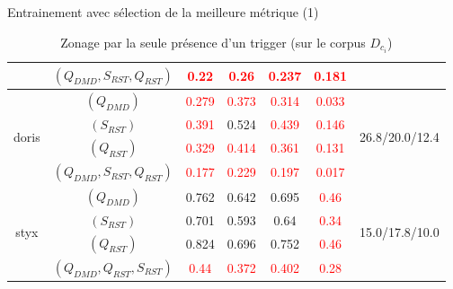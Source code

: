 \documentclass[newPxFont,pagenumber]{beamer}
\begin{document}
\begin{frame}{Entrainement avec sélection de la meilleure métrique (1)}
\begin{table}[!htbp]
\begin{tabular}{|c|c|c|c|c|c|c|}
 & $(Q_{DMD},S_{RST}, Q_{RST})$ & \textcolor{red}{0.22} & \textcolor{red}{0.26} & \textcolor{red}{0.237} & \textcolor{red}{0.181} &  \\  \hline
 \multirow{4}{*}{doris} & $(Q_{DMD})$ & \textcolor{red}{0.279} & \textcolor{red}{0.373} & \textcolor{red}{0.314} & \textcolor{red}{0.033} & \multirow{4}{*}{26.8/20.0/12.4} \\ 
 & $(S_{RST})$ & \textcolor{red}{0.391} & 0.524 & \textcolor{red}{0.439} & \textcolor{red}{0.146} &  \\ 
 & $(Q_{RST})$ & \textcolor{red}{0.329} & \textcolor{red}{0.414} & \textcolor{red}{0.361} & \textcolor{red}{0.131} &  \\ 
 & $(Q_{DMD},S_{RST}, Q_{RST})$ & \textcolor{red}{0.177} & \textcolor{red}{0.229} & \textcolor{red}{0.197} & \textcolor{red}{0.017} &  \\  \hline
\multirow{4}{*}{styx} & $(Q_{DMD})$ & 0.762 & 0.642 & 0.695 & \textcolor{red}{0.46} & \multirow{4}{*}{15.0/17.8/10.0} \\ 
 & $(S_{RST})$ & 0.701 & 0.593 & 0.64 & \textcolor{red}{0.34} &  \\ 
 & $(Q_{RST})$ & 0.824 & 0.696 & 0.752 & \textcolor{red}{0.46} &  \\ 
 & $(Q_{DMD}, Q_{RST}, S_{RST})$ & \textcolor{red}{0.44} & \textcolor{red}{0.372} & \textcolor{red}{0.402} & \textcolor{red}{0.28} &  \\  \hline
\end{tabular} 
%
%
%
%
%
\caption{\scriptsize Zonage par la seule présence d'un trigger (sur le corpus $D_{c_i}$)}\label{resultats-mult-dmd-doc-level}
\end{table}
\end{frame}
\end{document}
